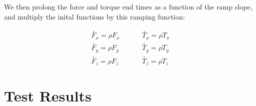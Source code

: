\documentclass[]{BasiliskReportMemo}
\begin{document}
\begin{enumerate}
 

We then prolong the force and torque end times as a function of the ramp slope, and multiply the inital functions by this ramping function:

\begin{align}
\tilde{F_x} = \rho F_{x} &\hspace{1cm} \tilde{T_x} =\rho T_{x}  \\ 
\tilde{F_y} =  \rho F_{y}  &\hspace{1cm} \tilde{T_y} =\rho  T_{y} \\ 
\tilde{F_z} = \rho F_{z} &\hspace{1cm} \tilde{T_z} =\rho  T_{z} 
\end{align}

\end{enumerate}

\section{Test Results}
\end{document}
